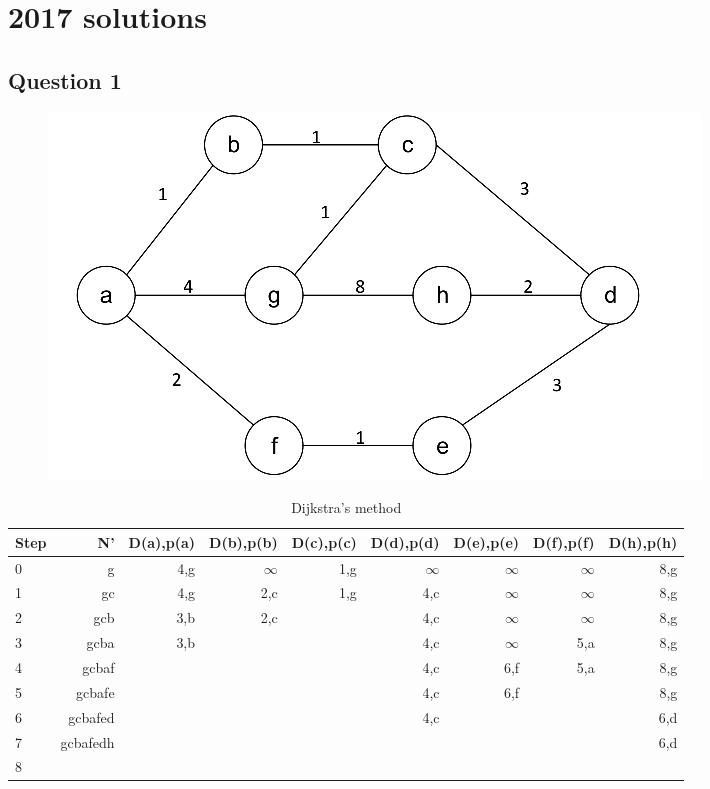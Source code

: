 \documentclass[12pt, a4paper]{article}
\begin{document}
\newpage
\section{2017 solutions}
\subsection{Question 1}
\begin{figure}[H]
	\includegraphics[width=\linewidth]{q1}
\end{figure}
\begin{table}[H]
	\centering
	\caption{Dijkstra's method}
	\begin{tabular}{lrrrrrrrr}
		\toprule
		Step &       N' & D(a),p(a) & D(b),p(b) & D(c),p(c) & D(d),p(d) & D(e),p(e) & D(f),p(f) & D(h),p(h) \\ \midrule
		0    &        g &       4,g &  $\infty$ &       1,g &  $\infty$ &  $\infty$ &  $\infty$ &       8,g \\
		1    &       gc &       4,g &       2,c &       1,g &       4,c &  $\infty$ &  $\infty$ &       8,g \\
		2    &      gcb &       3,b &       2,c &           &       4,c &  $\infty$ &  $\infty$ &       8,g \\
		3    &     gcba &       3,b &           &           &       4,c &  $\infty$ &       5,a &       8,g \\
		4    &    gcbaf &           &           &           &       4,c &       6,f &       5,a &       8,g \\
		5    &   gcbafe &           &           &           &       4,c &       6,f &           &       8,g \\
		6    &  gcbafed &           &           &           &       4,c &           &           &       6,d \\
		7    & gcbafedh &           &           &           &           &           &           &       6,d \\
		8    &          &           &           &           &           &           &           &
	\end{tabular}
\end{table}
\end{document}
